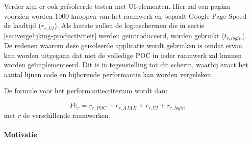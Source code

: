 Verder zijn er ook geïsoleerde testen met UI-elementen. 
Hier zal een  pagina voorzien worden 1000 knoppen van het raamwerk en bepaalt Google Page Speed de laadtijd ($r_{r,UI}$). 
Als laatste zullen de loginschermen die in sectie \ref{sec:vergelijking-productiviteit} werden geïntroduceerd, worden gebruikt ($t_{r,login}$). 
De redenen waarom deze geïsoleerde applicatie wordt gebruiken is omdat ervan kan worden uitgegaan dat niet de volledige POC in ieder raamwerk zal kunnen worden geïmplementeerd. 
Dit is in tegenstelling tot dit scherm, waarbij exact het aantal lijnen code en bijhorende performantie kan worden vergeleken.

De formule voor het performantiecriterium wordt dan: 

\begin{equation}
  Pe_r=r_{r,POC}+r_{r,AJAX}+r_{r,UI}+r_{r,login} 
  \label{eq:performantie}
\end{equation}
met $r$ de verschillende raamwerken.

\paragraph{Motivatie}


